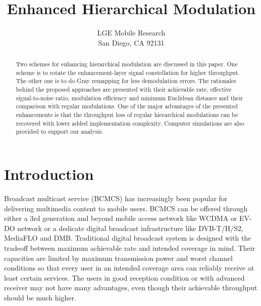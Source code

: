 \documentclass[10pt,fleqn, twocolumn]{IEEEtran}
\title{Enhanced Hierarchical Modulation}
\author{LGE Mobile Research\\San Diego, CA 92131}
\date{}
\begin{document}
\maketitle
\begin{abstract}\small
Two schemes for enhancing hierarchical modulation are discussed in
this paper. One scheme is to rotate the enhancement-layer signal
constellation for higher throughput. The other one is to do Gray
remapping for less demodulation errors. The rationales behind the
proposed approaches are presented with their achievable rate,
effective signal-to-noise ratio, modulation efficiency and minimum
Euclidean distance and their comparison with regular modulations.
One of the major advantages of the presented enhancements is that
the throughput loss of regular hierarchical modulations can be
recovered with lower added implementation complexity. Computer
simulations are also provided to support our analysis.
\end{abstract}
\section{Introduction}
Broadcast multicast service (BCMCS) has increasingly been popular
for delivering multimedia content to mobile users. BCMCS can be
offered through either a 3rd generation and beyond mobile access
network like WCDMA or EV-DO network or a dedicate digital
broadcast infrastructure like DVB-T/H/S2, MediaFLO and DMB.
Traditional digital broadcast system is designed with the tradeoff
between maximum achievable rate and intended coverage in mind.
Their capacities are limited by maximum transmission power and
worst channel conditions so that every user in an intended
coverage area can reliably receive at least certain services. The
users in good reception condition or with advanced receiver may
not have many advantages, even though their achievable throughput
should be much higher.
\end{document}
